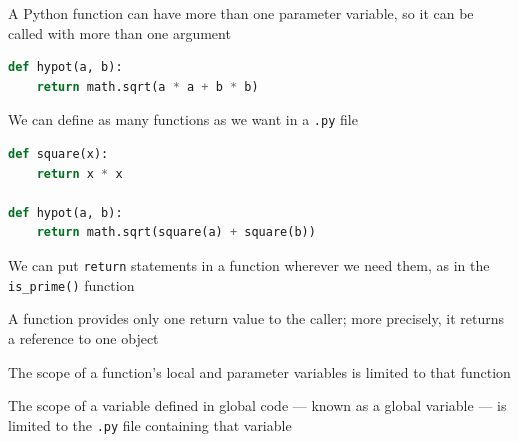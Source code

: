 \documentclass[8pt,a4paper,compress]{beamer}
\begin{document}
\begin{frame}[fragile]
\pause

A Python function can have more than one parameter variable, so it can be called with more than one argument

\smallskip

\begin{lstlisting}[language=Python,style=focusin]
def hypot(a, b):
    return math.sqrt(a * a + b * b)
\end{lstlisting}

\pause
\bigskip

We can define as many functions as we want in a \lstinline{.py} file

\smallskip

\begin{lstlisting}[language=Python,style=focusin]
def square(x):
    return x * x

def hypot(a, b):
    return math.sqrt(square(a) + square(b))
\end{lstlisting}

\pause
\bigskip

We can put \lstinline{return} statements in a function wherever we need them, as in the \lstinline{is_prime()} function

\pause
\bigskip

A function provides only one return value to the caller; more precisely, it returns a reference to one object

\pause
\bigskip

The scope of a function's local and parameter variables is limited to that function

\pause
\bigskip

The scope of a variable defined in global code --- known as a global variable --- is limited to the \lstinline{.py} file containing that variable
\end{frame}
\end{document}
